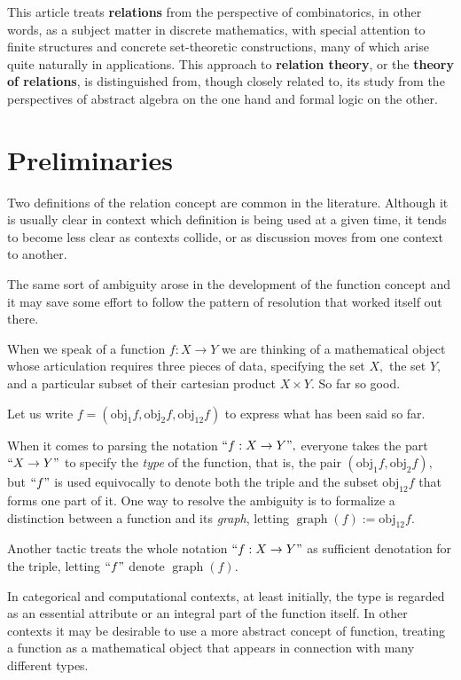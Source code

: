 \documentclass[12pt]{article}
\begin{document}
This article treats \textbf{relations} from the perspective of combinatorics, in other words, as a subject matter in discrete mathematics, with special attention to finite structures and concrete set-theoretic constructions, many of which arise quite naturally in applications.  This approach to \textbf{relation theory}, or the \textbf{theory of relations}, is distinguished from, though closely related to, its study from the perspectives of abstract algebra on the one hand and formal logic on the other.

\tableofcontents

\section{Preliminaries}

Two definitions of the relation concept are common in the literature.  Although it is usually clear in context which definition is being used at a given time, it tends to become less clear as contexts collide, or as discussion moves from one context to another.

The same sort of ambiguity arose in the development of the function concept and it may save some effort to follow the pattern of resolution that worked itself out there.

When we speak of a function $f : X \to Y$ we are thinking of a mathematical object whose articulation requires three pieces of data, specifying the set $X,$ the set $Y,$ and a particular subset of their cartesian product $X \times Y.$  So far so good.

Let us write $f = (\operatorname{obj_1}f, \operatorname{obj_2}f, \operatorname{obj_{12}}f)$ to express what has been said so far.

When it comes to parsing the notation $``f : X \to Y",$ everyone takes the part $``X \to Y"$ to specify the \textit{type} of the function, that is, the pair $(\operatorname{obj_1}f, \operatorname{obj_2}f),$ but $``f"$ is used equivocally to denote both the triple and the subset $\operatorname{obj_{12}}f$ that forms one part of it.  One way to resolve the ambiguity is to formalize a distinction between a function and its \textit{graph}, letting $\operatorname{graph}(f) := \operatorname{obj_{12}}f.$

Another tactic treats the whole notation $``f : X \to Y"$ as sufficient denotation for the triple, letting $``f"$ denote $\operatorname{graph}(f).$

In categorical and computational contexts, at least initially, the type is regarded as an essential attribute or an integral part of the function itself.  In other contexts it may be desirable to use a more abstract concept of function, treating a function as a mathematical object that appears in connection with many different types.
\end{document}

